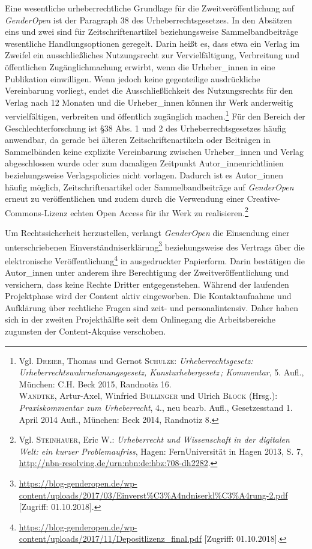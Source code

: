\documentclass[a4paper,
fontsize=11pt,
oneside,
numbers=noperiodatend,
parskip=half-,
bibliography=totoc,
final
]{scrartcl}
\begin{document}
Eine wesentliche urheberrechtliche Grundlage für die
Zweitveröffentlichung auf \emph{GenderOpen} ist der Paragraph 38 des
Urheberrechtsgesetzes. In den Absätzen eins und zwei sind für
Zeitschriftenartikel beziehungsweise Sammelbandbeiträge wesentliche
Handlungsoptionen geregelt. Darin heißt es, dass etwa ein Verlag im
Zweifel ein ausschließliches Nutzungsrecht zur Vervielfältigung,
Verbreitung und öffentlichen Zugänglichmachung erwirbt, wenn die
Urheber\_innen in eine Publikation einwilligen. Wenn jedoch keine
gegenteilige ausdrückliche Vereinbarung vorliegt, endet die
Ausschließlichkeit des Nutzungsrechts für den Verlag nach 12 Monaten und
die Urheber\_innen können ihr Werk anderweitig vervielfältigen,
verbreiten und öffentlich zugänglich machen.\footnote{Vgl.
  \textsc{Dreier}, Thomas und Gernot \textsc{Schulze}:
  \emph{Urheberrechtsgesetz: Urheberrechtswahrnehmungsgesetz,
  Kunsturhebergesetz\,; Kommentar}, 5. Aufl., München: C.H. Beck 2015,
  Randnotiz 16.\\
  \textsc{Wandtke}, Artur-Axel, Winfried \textsc{Bullinger} und Ulrich
  \textsc{Block} (Hrsg.): \emph{Praxiskommentar zum Urheberrecht}, 4.,
  neu bearb. Aufl., Gesetzesstand 1. April 2014 Aufl., München: Beck
  2014, Randnotiz 8.} Für den Bereich der Geschlechterforschung ist §38
Abs. 1 und 2 des Urheberrechtsgesetzes häufig anwendbar, da gerade bei
älteren Zeitschriftenartikeln oder Beiträgen in Sammelbänden keine
explizite Vereinbarung zwischen Urheber\_innen und Verlag abgeschlossen
wurde oder zum damaligen Zeitpunkt Autor\_innenrichtlinien
beziehungsweise Verlagspolicies nicht vorlagen. Dadurch ist es
Autor\_innen häufig möglich, Zeitschriftenartikel oder
Sammelbandbeiträge auf \emph{GenderOpen} erneut zu veröffentlichen und
zudem durch die Verwendung einer Creative-Commons-Lizenz echten Open
Access für ihr Werk zu realisieren.\footnote{Vgl. \textsc{Steinhauer},
  Eric W.: \emph{Urheberrecht und Wissenschaft in der digitalen Welt:
  ein kurzer Problemaufriss}, Hagen: FernUniversität in Hagen 2013, S.
  7, \url{http://nbn-resolving.de/urn:nbn:de:hbz:708-dh2282}.}

Um Rechtssicherheit herzustellen, verlangt \emph{GenderOpen} die
Einsendung einer unterschriebenen Einverständniserklärung\footnote{\url{https://blog-genderopen.de/wp-content/uploads/2017/03/Einverst\%C3\%A4ndniserkl\%C3\%A4rung-2.pdf}
  {[}Zugriff: 01.10.2018{]}.} beziehungsweise des Vertrags über die
elektronische Veröffentlichung\footnote{\url{https://blog-genderopen.de/wp-content/uploads/2017/11/Depositlizenz_final.pdf}
  {[}Zugriff: 01.10.2018{]}.} in ausgedruckter Papierform. Darin
bestätigen die Autor\_innen unter anderem ihre Berechtigung der
Zweitveröffentlichung und versichern, dass keine Rechte Dritter
entgegenstehen. Während der laufenden Projektphase wird der Content
aktiv eingeworben. Die Kontaktaufnahme und Aufklärung über rechtliche
Fragen sind zeit- und personalintensiv. Daher haben sich in der zweiten
Projekthälfte seit dem Onlinegang die Arbeitsbereiche zugunsten der
Content-Akquise verschoben.
\end{document}
